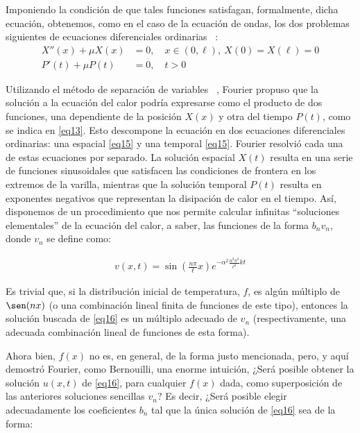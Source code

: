  Imponiendo la condición de que tales funciones satisfagan, formalmente, dicha ecuación, obtenemos, como en el caso de la ecuación de ondas, los dos problemas siguientes de ecuaciones diferenciales ordinarias ~\cite{demostracion-calor}:
\begin{equation} \label{eq15}
	\begin{split}
		X''(x) + \mu X(x) &= 0, \quad x \in (0, \ell), \ X(0) = X(\ell) = 0 \\
		P'(t) + \mu P(t) &= 0, \quad t > 0
	\end{split}
\end{equation}

Utilizando el método de separación de variables ~\cite{demostracion-calor-feldman}, Fourier propuso que la solución a la ecuación del calor podría expresarse como el producto de dos funciones, una dependiente de la posición \( X(x) \) y otra del tiempo \( P(t) \), como se indica en \eqref{eq13}. Esto descompone la ecuación en dos ecuaciones diferenciales ordinarias: una espacial \eqref{eq15} y una temporal \eqref{eq15}. Fourier resolvió cada una de estas ecuaciones por separado. La solución espacial \( X(t) \) resulta en una serie de funciones sinusoidales que satisfacen las condiciones de frontera en los extremos de la varilla, mientras que la solución temporal \( P(t) \) resulta en exponentes negativos que representan la disipación de calor en el tiempo. Así, disponemos de un procedimiento que nos permite calcular infinitas “soluciones elementales” de la ecuación del calor, a saber, las funciones de la forma \( b_n v_n \), donde \( v_n \) se define como:

\begin{equation} \label{eq16}
	\begin{split}
		v(x,t) = \sin \left( \frac{n \pi}{\ell} x \right) e^{- \alpha^2 \frac{n^2 \pi^2}{\ell^2} k t}
	\end{split}
\end{equation}

Es trivial que, si la distribución inicial de temperatura, \( f \), es algún múltiplo de \( \sen(nx) \) (o una combinación lineal finita de funciones de este tipo), entonces la solución buscada de \eqref{eq16} es un múltiplo adecuado de \( v_n \) (respectivamente, una adecuada combinación lineal de funciones de esta forma).

Ahora bien, \( f(x) \) no es, en general, de la forma justo mencionada, pero, y aquí demostró Fourier, como Bernouilli, una enorme intuición, ¿Será posible obtener la solución \( u(x,t)\) de \eqref{eq16}, para cualquier \( f(x)\) dada, como superposición de las anteriores soluciones sencillas \( v_n \)? Es decir, ¿Será posible elegir adecuadamente los coeficientes \( b_n \) tal que la única solución de \eqref{eq16} sea de la forma:

